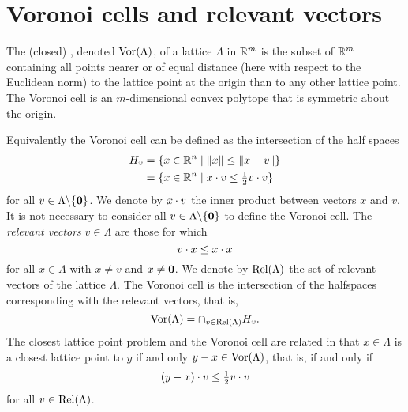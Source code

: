 \documentclass[final,leqno]{siamltex}
\begin{document}
\section{Voronoi cells and relevant vectors}\label{sec:voron-cells-relev}
\newcommand{\calR}{\mathcal{R}}
The (closed) , denoted $\operatorname{Vor}(\Lambda)$, of a lattice $\Lambda$ in ${\mathbb R}^m$ is the subset of ${\mathbb R}^m$ containing all points nearer or of equal distance (here with respect to the Euclidean norm) to the lattice point at the origin than to any other lattice point. The Voronoi cell is an $m$-dimensional convex polytope that is symmetric about the origin. %
 
Equivalently the Voronoi cell can be defined as the intersection of the half spaces 
\begin{align*}
H_{v} &= \{x \in {\mathbb R}^n \mid \|x\| \leq \|x - v\| \} \\
&= \{x \in {\mathbb R}^n \mid x \cdot v \leq \tfrac{1}{2}v \cdot v \}
\end{align*}
for all $v \in \Lambda \backslash  \{\boldsymbol{0}\}$.  %
We denote by $x \cdot v$ the inner product between vectors $x$ and $v$.
It is not necessary to consider all $v \in \Lambda \backslash  \{\boldsymbol{0}\}$ to define the Voronoi cell.   %
The \emph{relevant vectors} $v \in \Lambda$ are those for which  
\[
v \cdot x \leq x \cdot x
\]
for all $x \in \Lambda$ with $x \neq v$ and $x \neq \boldsymbol{0}$.  We denote by $\operatorname{Rel}(\Lambda)$ the set of relevant vectors of the lattice $\Lambda$.  The Voronoi cell is the intersection of the halfspaces corresponding with the relevant vectors, that is, 
\[
\operatorname{Vor}(\Lambda) = \cap_{v\in\operatorname{Rel}(\Lambda)}{H_{v}}.
\]
The closest lattice point problem and the Voronoi cell are related in that $x\in\Lambda$ is a closest lattice point to $y$ if and only $y - x \in \operatorname{Vor}(\Lambda)$, that is, if and only if
\begin{equation}\label{eq:relvectnearpointieq}
\dotprod{(y - x)}{v} \leq \tfrac{1}{2} \dotprod{v}{v}
\end{equation} 
for all $v \in \operatorname{Rel}(\Lambda)$.  
\end{document}

